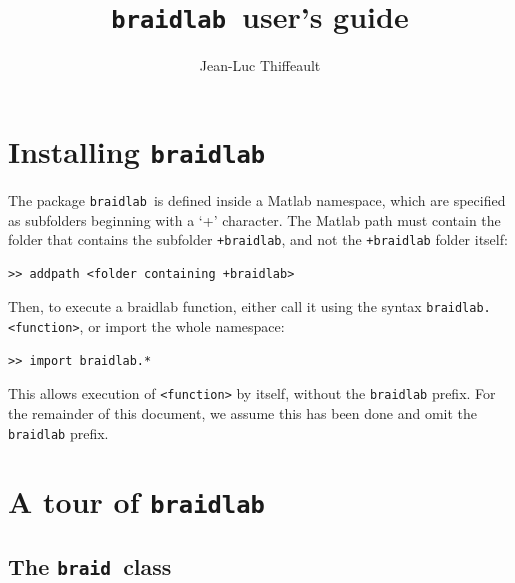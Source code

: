 \documentclass[12pt]{article}
\newcommand{\braidlab}{\texttt{braidlab}}%
\newcommand{\braid}{\texttt{braid}}%
\begin{document}
\lstset{language=Matlab}
\lstset{breaklines=true}

\lstset{%
basicstyle=\small\ttfamily,
keywordstyle=\small\ttfamily,
identifierstyle=,
commentstyle=\small\ttfamily,
stringstyle=\small\ttfamily,
showstringspaces=false}


\title{\braidlab\ user's guide}
\author{Jean-Luc Thiffeault}
\maketitle

\section{Installing \braidlab}

The package \braidlab\ is defined inside a Matlab namespace, which are
specified as subfolders beginning with a `+' character.  The Matlab
path must contain the folder that contains the subfolder
\lstinline{+braidlab}, and not the \lstinline{+braidlab} folder
itself:
\begin{lstlisting}[frame=single,framerule=0pt]
>> addpath <folder containing +braidlab>
\end{lstlisting}
Then, to execute a braidlab function, either call it using the syntax
\lstinline{braidlab.<function>}, or import the whole namespace:
\begin{lstlisting}[frame=single,framerule=0pt]
>> import braidlab.*
\end{lstlisting}
This allows execution of \lstinline{<function>} by itself, without the
\lstinline{braidlab} prefix.  For the remainder of this document, we
assume this has been done and omit the \lstinline{braidlab} prefix.

\section{A tour of \braidlab}

\subsection{The \braid\ class}
\end{document}
